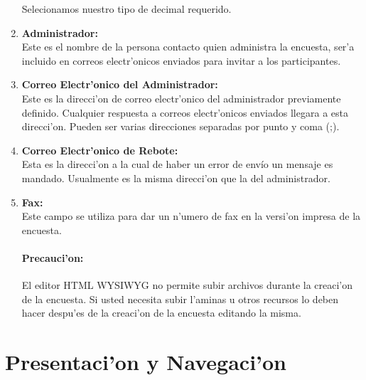 \documentclass[12pt,spanish]{report}
\begin{document}
\begin{enumerate}
		Selecionamos nuestro tipo de decimal requerido.
	\item {\bf Administrador: } \\
		 Este es el nombre de la persona contacto quien administra la encuesta, ser'a incluido en correos electr'onicos enviados para invitar a los participantes.
	\item {\bf Correo Electr'onico del Administrador: } \\
		 Este es la direcci'on de correo electr'onico del administrador previamente definido. Cualquier respuesta a correos electr'onicos enviados llegara a esta direcci'on. Pueden ser varias direcciones separadas por punto y coma (;).
	\item {\bf Correo Electr'onico de Rebote: } \\
		 Esta es la direcci'on a la cual de haber un error de envío un mensaje es mandado. Usualmente es la misma direcci'on que la del administrador.
	\item {\bf Fax: } \\
	 	Este campo se utiliza para dar un n'umero de fax en la versi'on impresa de la encuesta.
	\paragraph{ Precauci'on: }
	 El editor HTML WYSIWYG no permite subir archivos durante la creaci'on de la encuesta. Si usted necesita subir l'aminas u otros recursos lo deben hacer despu'es de la creaci'on de la encuesta editando la misma.
\end{enumerate}


\section {Presentaci'on y Navegaci'on}
\end{document}
